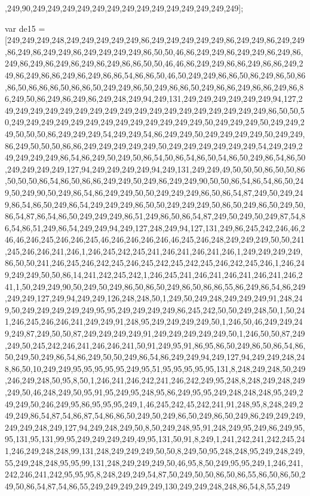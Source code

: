 ,249,90,249,249,249,249,249,249,249,249,249,249,249,249,249,249];

var de15 = [249,249,249,248,249,249,249,249,249,86,249,249,249,249,249,86,249,249,86,249,249,86,249,86,249,249,86,249,249,249,249,86,50,50,46,86,249,249,86,249,249,86,249,86,249,86,249,86,249,86,249,86,249,86,86,50,50,46,46,86,249,249,86,86,249,86,86,249,249,86,249,86,86,249,86,249,86,86,54,86,86,50,46,50,249,249,86,86,50,86,249,86,50,86,86,50,86,86,86,50,86,86,50,249,249,86,50,249,86,86,50,249,86,86,249,86,86,249,86,86,249,50,86,249,86,249,86,249,248,249,94,249,131,249,249,249,249,249,249,94,127,249,249,249,249,249,249,249,249,249,249,249,249,249,249,249,249,249,249,86,50,50,50,249,249,249,249,249,249,249,249,249,249,249,249,249,50,249,249,249,50,249,249,249,50,50,50,86,249,249,249,54,249,249,54,86,249,249,50,249,249,249,249,50,249,249,86,249,50,50,50,86,86,249,249,249,249,249,50,249,249,249,249,249,249,54,249,249,249,249,249,249,86,54,86,249,50,249,50,86,54,50,86,54,86,50,54,86,50,249,86,54,86,50,249,249,249,249,127,94,249,249,249,249,94,249,131,249,249,49,50,50,50,86,50,50,86,50,50,50,86,54,86,50,86,86,249,249,50,249,86,249,249,90,50,50,86,54,86,54,86,50,249,50,249,90,50,249,86,54,86,249,249,50,50,249,249,249,86,50,86,54,87,249,50,249,249,86,54,86,50,249,86,54,249,249,249,86,50,50,249,249,249,50,86,50,249,86,50,249,50,86,54,87,86,54,86,50,249,249,249,86,51,249,86,50,86,54,87,249,50,249,50,249,87,54,86,54,86,51,249,86,54,249,249,94,249,127,248,249,94,127,131,249,86,245,242,246,46,246,46,246,245,246,246,245,46,246,246,246,246,46,245,246,248,249,249,249,50,50,241,245,246,246,241,246,1,246,245,242,245,241,246,241,246,241,246,1,249,249,249,249,86,50,50,241,246,245,246,242,245,246,245,242,245,242,245,246,242,245,246,1,246,249,249,249,50,50,86,14,241,242,245,242,1,246,245,241,246,241,246,241,246,241,246,241,1,50,249,249,90,50,249,50,249,86,50,86,50,249,86,50,86,86,55,86,249,86,54,86,249,249,249,127,249,94,249,249,126,248,248,50,1,249,50,249,248,249,249,249,91,248,249,50,249,249,249,249,249,95,95,249,249,249,249,86,245,242,50,50,249,248,50,1,50,241,246,245,246,246,241,249,249,91,248,95,249,249,249,249,50,1,246,50,46,249,249,249,249,87,249,50,50,87,249,249,249,249,91,249,249,249,249,249,50,1,246,50,50,87,249,249,50,245,242,246,241,246,246,241,50,91,249,95,91,86,95,86,50,249,86,50,86,54,86,50,249,50,249,86,54,86,249,50,50,249,86,54,86,249,249,94,249,127,94,249,249,248,248,86,50,10,249,249,95,95,95,95,95,249,95,51,95,95,95,95,95,131,8,248,249,248,50,249,246,249,248,50,95,8,50,1,246,241,246,242,241,246,242,249,95,248,8,248,249,248,249,249,50,46,248,249,50,95,91,95,249,95,248,95,86,249,95,95,249,248,248,248,95,249,249,249,50,246,249,95,86,95,95,95,249,1,46,245,242,45,242,241,91,248,95,8,248,249,249,249,86,54,87,54,86,87,54,86,86,50,249,50,249,86,50,249,86,50,249,86,249,249,249,249,249,248,249,127,94,249,248,249,50,8,50,249,248,95,91,248,249,95,249,86,249,95,95,131,95,131,99,95,249,249,249,249,49,95,131,50,91,8,249,1,241,242,241,242,245,241,246,249,248,248,99,131,248,249,249,249,50,50,8,249,50,95,248,248,95,249,248,249,55,249,248,248,95,95,99,131,248,249,249,249,50,46,95,8,50,249,95,95,249,1,246,241,242,246,241,242,95,95,95,8,248,249,249,54,87,50,249,50,50,86,50,86,55,86,50,86,50,249,50,86,54,87,54,86,55,249,249,249,249,249,130,249,249,248,248,86,54,8,55,249